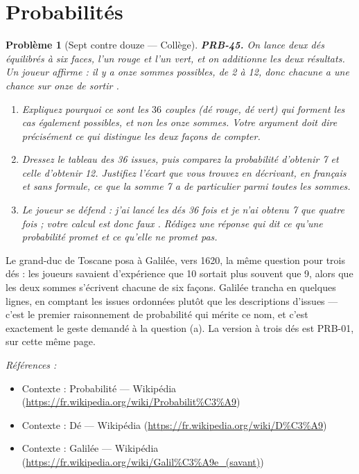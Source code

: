 \documentclass[11pt]{article}
\newtheorem{problem}{Problème}
\newenvironment{refs}{\par\small\noindent\emph{Références :}\begin{itemize}\setlength\itemsep{0pt}}{\end{itemize}\normalsize}
\begin{document}
\bigskip


\section*{Probabilités}

\begin{problem}[{Sept contre douze --- Collège}]
\textbf{PRB-45.} On lance deux dés équilibrés à six faces, l'un rouge et l'un vert, et on
additionne les deux résultats. Un joueur affirme : \og{} il y a onze sommes possibles, de 2 à 12, donc
chacune a une chance sur onze de sortir \fg{}.
\begin{enumerate}
\item[(a)] Expliquez pourquoi ce sont les $ 36 $ couples (dé rouge, dé vert) qui forment les cas
également possibles, et non les onze sommes. Votre argument doit dire précisément ce qui distingue
les deux façons de compter.
\item[(b)] Dressez le tableau des 36 issues, puis comparez la probabilité d'obtenir 7 et celle d'obtenir
12. Justifiez l'écart que vous trouvez en décrivant, en français et sans formule, ce que la somme 7
a de particulier parmi toutes les sommes.
\item[(c)] Le joueur se défend : \og{} j'ai lancé les dés 36 fois et je n'ai obtenu 7 que quatre fois ; votre
calcul est donc faux \fg{}. Rédigez une réponse qui dit ce qu'une probabilité promet et ce qu'elle ne
promet pas.
\end{enumerate}

\end{problem}

\noindent Le grand-duc de Toscane posa à Galilée, vers 1620, la même question pour trois
dés : les joueurs savaient d'expérience que 10 sortait plus souvent que 9, alors que les deux
sommes s'écrivent chacune de six façons. Galilée trancha en quelques lignes, en comptant les issues
ordonnées plutôt que les descriptions d'issues --- c'est le premier raisonnement de probabilité qui
mérite ce nom, et c'est exactement le geste demandé à la question (a). La version à trois dés est
PRB-01, sur cette même page.

\begin{refs}
\item Contexte : Probabilité --- Wikipédia (\url{https://fr.wikipedia.org/wiki/Probabilit%C3%A9})
\item Contexte : Dé --- Wikipédia (\url{https://fr.wikipedia.org/wiki/D%C3%A9})
\item Contexte : Galilée --- Wikipédia (\url{https://fr.wikipedia.org/wiki/Galil%C3%A9e_(savant)})
\end{refs}
\end{document}
